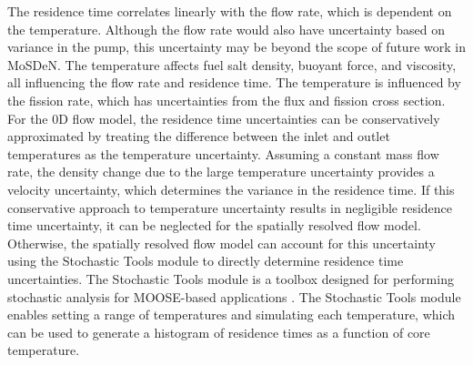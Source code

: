 The residence time correlates linearly with the flow rate, which is dependent on the temperature.
Although the flow rate would also have uncertainty based on variance in the pump, this uncertainty may be beyond the scope of future work in \gls{MoSDeN}.
The temperature affects fuel salt density, buoyant force, and viscosity, all influencing the flow rate and residence time.
The temperature is influenced by the fission rate, which has uncertainties from the flux and fission cross section.
For the 0D flow model, the residence time uncertainties can be conservatively approximated by treating the difference between the inlet and outlet temperatures as the temperature uncertainty.
Assuming a constant mass flow rate, the density change due to the large temperature uncertainty provides a velocity uncertainty, which determines the variance in the residence time.
If this conservative approach to temperature uncertainty results in negligible residence time uncertainty, it can be neglected for the spatially resolved flow model.
Otherwise, the spatially resolved flow model can account for this uncertainty using the Stochastic Tools module to directly determine residence time uncertainties.
The Stochastic Tools module is a toolbox designed for performing stochastic analysis for \gls{MOOSE}-based applications \cite{slaughter2023moose}.
The Stochastic Tools module enables setting a range of temperatures and simulating each temperature, which can be used to generate a histogram of residence times as a function of core temperature.

